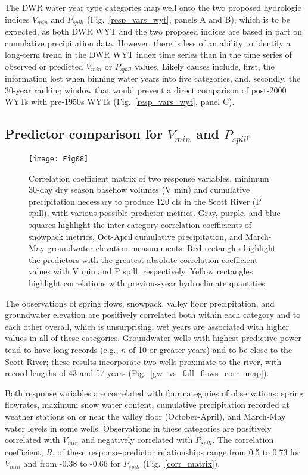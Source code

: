 \documentclass[hess, manuscript]{copernicus}
\begin{document}
The DWR water year type categories map well onto the two proposed
hydrologic indices $V_{min}$ and $P_{spill}$
(Fig.~\ref{resp_vars_wyt}, panels A and B), which is to be expected,
as both DWR WYT and the two proposed indices are based in part on
cumulative precipitation data. However, there is less of an ability to
identify a long-term trend in the DWR WYT index time series than in the
time series of observed or predicted $V_{min}$ or $P_{spill}$
values. Likely causes include, first, the information lost when binning
water years into five categories, and, secondly, the 30-year ranking
window that would prevent a direct comparison of post-2000 WYTs with
pre-1950s WYTs (Fig.~\ref{resp_vars_wyt}, panel C).

\subsection{\texorpdfstring{Predictor comparison for $V_{min}$ and
$P_{spill}$}{Predictor comparison for V\_\{min\} and P\_\{spill\}}}

\begin{figure}
\texttt{[image: Fig08]} \caption{\label{fig:corr_matrix} Correlation coefficient matrix of two response variables, minimum 30-day dry season baseflow volumes (V min) and cumulative precipitation necessary to produce 120 cfs in the Scott River (P spill), with various possible predictor metrics. Gray, purple, and blue squares highlight the inter-category correlation coefficients of snowpack metrics, Oct-April cumulative precipitation, and March-May groundwater elevation measurements. Red rectangles highlight the predictors with the greatest absolute correlation coefficient values with V min and P spill, respectively. Yellow rectangles highlight correlations with previous-year hydroclimate quantities.}\label{fig:corr_matrix}
\end{figure}

The observations of spring flows, snowpack, valley floor precipitation,
and groundwater elevation are positively correlated both within each
category and to each other overall, which is unsurprising: wet years are
associated with higher values in all of these categories. Groundwater
wells with highest predictive power tend to have long records (e.g.,
$n$ of 10 or greater years) and to be close to the Scott River; these
results incorporate two wells proximate to the river, with record
lengths of 43 and 57 years (Fig.~\ref{gw_vs_fall_flows_corr_map}).

Both response variables are correlated with four categories of
observations: spring flowrates, maximum snow water content, cumulative
precipitation recorded at weather stations on or near the valley floor
(October-April), and March-May water levels in some wells. Observations
in these categories are positively correlated with $V_{min}$ and
negatively correlated with $P_{spill}$. The correlation coefficient,
$R$, of these response-predictor relationships range from 0.5 to 0.73
for $V_{min}$ and from -0.38 to -0.66 for $P_{spill}$
(Fig.~\ref{corr_matrix}).
\end{document}
